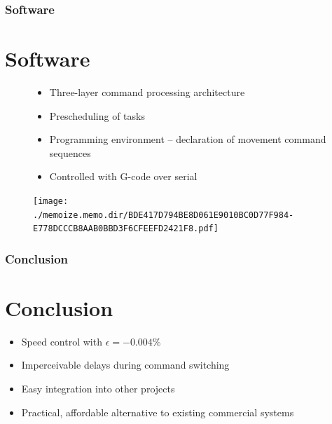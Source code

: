 \documentclass[aspectratio=43]{beamer}
\begin{document}
\begin{frame}[fragile]
  \frametitle{Software}
  \section{Software}
	\begin{figure}[!htb]
		\begin{minipage}{0.48\textwidth}
			\begin{itemize}
    \item Three-layer command processing architecture
    \item Prescheduling of tasks
    \item Programming environment -- declaration of movement command sequences
    \item Controlled with G-code over serial
			\end{itemize}
		\end{minipage}\hfill
		\begin{minipage}{0.48\textwidth}
			\centering
			\texttt{[image: ./memoize.memo.dir/BDE417D794BE8D061E9010BC0D77F984-E778DCCCB8AAB0BBD3F6CFEEFD2421F8.pdf]}
		\end{minipage}
	\end{figure}
\end{frame}

\begin{frame}[fragile]
  \frametitle{Conclusion}
  \section{Conclusion}
  \begin{itemize}
    \item Speed control with $\epsilon=-0.004\%$
    \item Imperceivable delays during command switching
    \item Easy integration into other projects
    \item Practical, affordable alternative to existing commercial systems
  \end{itemize}
\end{frame}
\end{document}

